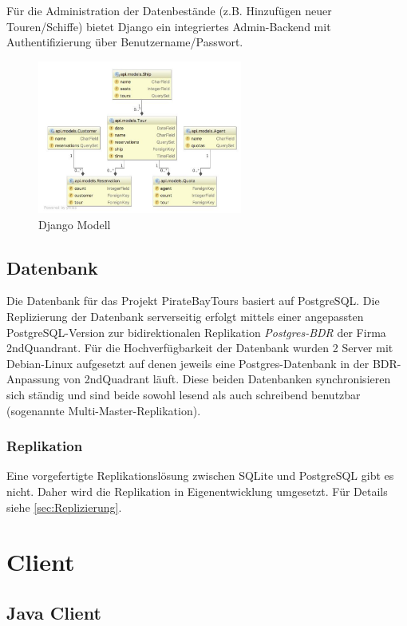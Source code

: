 \documentclass[12pt,a4paper,ngerman,english]{report}
\begin{document}
Für die Administration der Datenbestände (z.B. Hinzufügen neuer Touren/Schiffe) bietet Django ein integriertes Admin-Backend mit Authentifizierung über Benutzername/Passwort.

\begin{figure}[h]
	\centering
	\includegraphics[width=0.6\textwidth]{img/django-modell.png}
	\caption{Django Modell}
	\label{fig:django-modell}
\end{figure}

\subsection{Datenbank}

Die Datenbank für das Projekt PirateBayTours basiert auf PostgreSQL. Die Replizierung der Datenbank serverseitig erfolgt mittels einer angepassten PostgreSQL-Version zur bidirektionalen Replikation \textit{Postgres-BDR} der Firma 2ndQuandrant. Für die Hochverfügbarkeit der Datenbank wurden 2 Server mit Debian-Linux aufgesetzt auf denen jeweils eine Postgres-Datenbank in der BDR-Anpassung von 2ndQuadrant läuft. Diese beiden Datenbanken synchronisieren sich ständig und sind beide sowohl lesend als auch schreibend benutzbar (sogenannte Multi-Master-Replikation).


\subsubsection{Replikation}

Eine vorgefertigte Replikationslösung zwischen SQLite und PostgreSQL gibt es nicht. Daher wird die Replikation in Eigenentwicklung umgesetzt. Für Details siehe \autoref{sec:Replizierung}.

\section{Client}
\subsection{Java Client}
\end{document}

